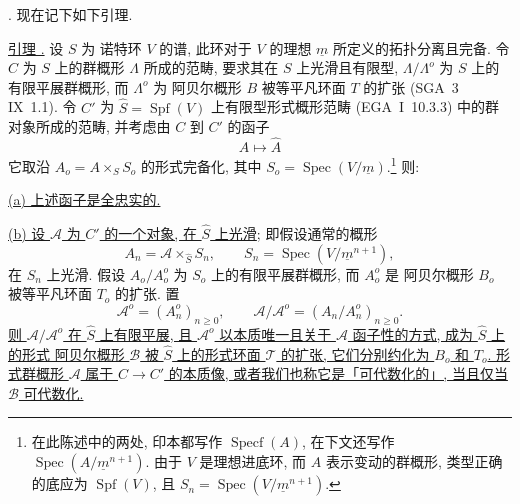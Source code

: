 
\medskip
\noindent
{}. 现在记下如下引理.

\medskip
\noindent
\underline{引理 .} 设 $S$ 为 诺特环 $V$ 的谱, 此环对于 $V$ 的理想 $\underline m$ 所定义的拓扑分离且完备. 令 $C$ 为 $S$ 上的群概形 $\Lambda$ 所成的范畴, 要求其在 $S$ 上光滑且有限型, $\Lambda/\Lambda^o$ 为 $S$ 上的有限平展群概形, 而 $\Lambda^o$ 为 阿贝尔概形 $B$ 被等平凡环面 $T$ 的扩张 (SGA~3 IX~1.1). 令 $C'$ 为 $\widehat S=\operatorname{Spf}(V)$ 上有限型形式概形范畴 (EGA~I~10.3.3) 中的群对象所成的范畴, 并考虑由 $C$ 到 $C'$ 的函子
\[
 A\longmapsto\widehat A
\]
它取沿 $A_o=A\times_S S_o$ 的形式完备化, 其中 $S_o=\operatorname{Spec}(V/\underline m)$.\footnote{在此陈述中的两处, 印本都写作 $\operatorname{Specf}(A)$, 在下文还写作 $\operatorname{Spec}(A/\underline m^{n+1})$. 由于 $V$ 是理想进底环, 而 $A$ 表示变动的群概形, 类型正确的底应为 $\operatorname{Spf}(V)$, 且 $S_n=\operatorname{Spec}(V/\underline m^{n+1})$.} 则:

\smallskip
\noindent
\underline{(a) 上述函子是全忠实的.}

\smallskip
\noindent
\underline{(b) 设 $\mathcal A$ 为 $C'$ 的一个对象, 在 $\widehat S$ 上光滑}; 即假设通常的概形
\[
 A_n=\mathcal A\times_{\widehat S}S_n,
 \qquad
 S_n=\operatorname{Spec}(V/\underline m^{n+1}),
\]
在 $S_n$ 上光滑. 假设 $A_o/A_o^o$ 为 $S_o$ 上的有限平展群概形, 而 $A_o^o$ 是 阿贝尔概形 $B_o$ 被等平凡环面 $T_o$ 的扩张. 置
\[
 \mathcal A^o=(A_n^o)_{n\geq0},
 \qquad
 \mathcal A/\mathcal A^o=(A_n/A_n^o)_{n\geq0}.
\]
\underline{则 $\mathcal A/\mathcal A^o$ 在 $\widehat S$ 上有限平展, 且 $\mathcal A^o$ 以本质唯一且关于 $\mathcal A$ 函子性的方式, 成为 $\widehat S$ 上的形式 阿贝尔概形 $\mathcal B$ 被 $\widehat S$ 上的形式环面 $\mathcal T$ 的扩张, 它们分别约化为 $B_o$ 和 $T_o$. 形式群概形 $\mathcal A$ 属于 $C\longrightarrow C'$ 的本质像, 或者我们也称它是「可代数化的」, 当且仅当 $\mathcal B$ 可代数化.}

